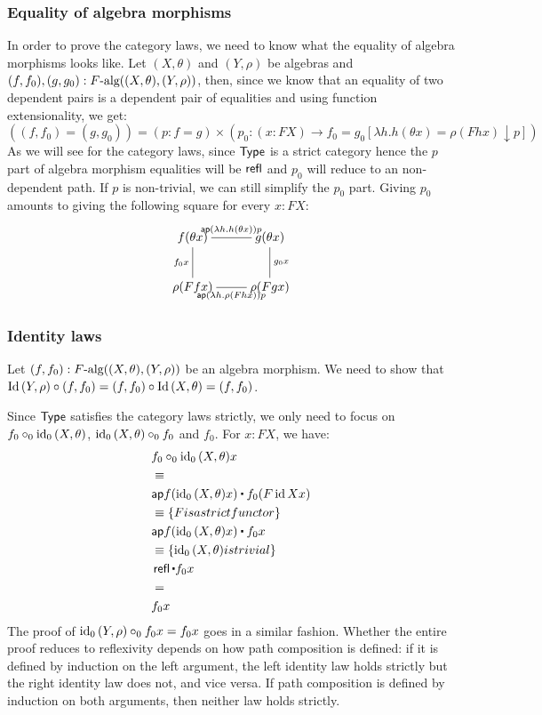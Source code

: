 \documentclass[a4paper,10pt]{article}
\begin{document}
\subsubsection{Equality of algebra morphisms}

In order to prove the category laws, we need to know what the equality
of algebra morphisms looks like. Let $(X,\theta)$ and $(Y, \rho)$ be
algebras and $(f,f_0) ,(g, g_0) : F\mbox{-alg}((X,\theta),(Y,\rho))$,
then, since we know that an equality of two dependent pairs is a
dependent pair of equalities and using function extensionality, we
get:
$$
((f,f_0) = (g,g_0)) = (p : f = g) \times (p_0 : (x : FX) \to f_0 = g_0 [ \lambda h . h (\theta x) = \rho (F h x) \downarrow p ])
$$
As we will see for the category laws, since $\mathsf{Type}$ is a strict
category hence the $p$ part of algebra morphism equalities will be
$\operatorname{\mathsf{refl}}$ and $p_0$ will reduce to an non-dependent path. If $p$ is
non-trivial, we can still simplify the $p_0$ part. Giving $p_0$
amounts to giving the following square for every $x : FX$:
$$
\xymatrix{
f (\theta x) \ar@{-}[d]_{f_0 x} \ar@{-}[r]^{\ap (\lambda h . h (\theta x)) p}  &g (\theta x) \ar@{-}[d]^{g_0 x} \\
\rho (F f x) \ar@{-}[r]_{\ap (\lambda h . \rho (F h x)) p} &\rho (F g x) }
$$

\subsubsection{Identity laws}

Let $(f , f_0) : F\mbox{-alg}((X,\theta),(Y,\rho))$ be an algebra
morphism. We need to show that
$\operatorname*{Id}{(Y,\rho)} \circ (f , f_0) = (f , f_0) \circ \operatorname*{Id}{(X,\theta)} =
(f,f_0)$.

Since $\mathsf{Type}$ satisfies the category laws strictly, we only need to
focus on $f_0 \circ_0 \operatorname*{id_0}{(X,\theta)}$, $\operatorname*{id_0}{(X,\theta)} \circ_0 f_0$
and $f_0$. For $x : FX$, we have:
%
\begin{align*}
  &f_0 \circ_0 \ido{(X,\theta)} x \\
  &\defeq \\
  &\ap f (\ido{(X,\theta)} x) \ct f_0 (F \id{X} x) \\
  &\defeq \{ F is a strict functor \} \\
  &\ap f (\ido{(X,\theta)} x) \ct f_0 x \\
  &\defeq \{ \ido{(X,\theta)} is trivial \} \\
  &\refl \ct f_0 x \\
  &= \\
  &f_0 x
\end{align*}
%
The proof of $\operatorname*{id_0}{(Y,\rho)} \circ_0 f_0 x = f_0 x$ goes in a similar
fashion. Whether the entire proof reduces to reflexivity depends on
how path composition is defined: if it is defined by induction on the
left argument, the left identity law holds strictly but the right
identity law does not, and vice versa. If path composition is defined
by induction on both arguments, then neither law holds strictly.
\end{document}
